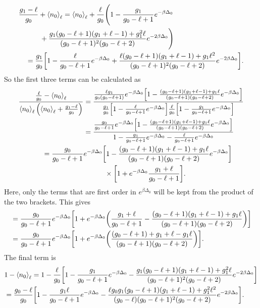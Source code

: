 \begin{align}
    &\frac{g_1-\ell}{g_0}+\left<{n_0}\right>_\ell=\left<{n_0}\right>_\ell+\frac{\ell}{g_0}\Biggr(1-\frac{g_1}{g_0-\ell+1}e^{-\beta\Delta_0}\nonumber\\
    &\quad\quad\quad+\frac{g_1(g_0-\ell+1)(g_1+\ell-1)+g_1^2 \ell}{(g_0-\ell+1)^2(g_0-\ell+2)} e^{-2\beta\Delta_0}\Biggr)\nonumber\\
    &\quad=\frac{g_1}{g_0}\qty[1-\frac{\ell}{g_0-\ell+1}e^{-\beta\Delta_0}+\frac{\ell(g_0-\ell+1)(g_1+\ell-1)+g_1\ell^2}{(g_0-\ell+1)^2(g_0-\ell+2)} e^{-2\beta\Delta_0}].
\end{align}
So the first three terms can be calculated as 
\begin{align}
    \frac{\frac{\ell}{g_0}-\left<{n_0}\right>_\ell}{\left<{n_0}\right>_\ell\qty(\left<{n_0}\right>_\ell+\frac{g_1-\ell}{g_0})}&=\frac{\frac{\ell g_1}{g_0(g_0-\ell+1)}e^{-\beta\Delta_0}\qty[1-\frac{(g_0-\ell+1)(g_1+\ell-1)+g_1\ell}{(g_0-\ell+1)(g_0-\ell+2)}e^{-\beta\Delta_0}]}{\frac{g_1}{g_0}\qty[1-\frac{\ell}{g_0-\ell+1} e^{-\beta\Delta_0}]\frac{\ell}{g_0}\qty[1-\frac{g_1}{g_0-\ell+1} e^{-\beta\Delta_0}]}\nonumber\\
    &=\frac{\frac{g_0}{g_0-\ell+1}e^{-\beta\Delta_0}\qty[1-\frac{(g_0-\ell+1)(g_1+\ell-1)+g_1\ell}{(g_0-\ell+1)(g_0-\ell+2)}e^{-\beta\Delta_0}]}{1-\frac{g_1}{g_0-\ell+1}e^{-\beta\Delta_0}-\frac{\ell}{g_0-\ell+1}e^{-\beta\Delta_0}}\nonumber\\
    =\frac{g_0}{g_0-\ell+1}&e^{-\beta\Delta_0}\qty[1-\frac{(g_0-\ell+1)(g_1+\ell-1)+g_1\ell}{(g_0-\ell+1)(g_0-\ell+2)}e^{-\beta\Delta_0}]\nonumber\\
    &\quad\quad\quad\times\qty[1+e^{-\beta\Delta_0} \frac{g_1+\ell}{g_0-\ell+1}].
\end{align}
Here, only the terms that are first order in $e^{\beta\Delta_0}$ will be kept from the product of the two brackets. This gives
\begin{align}
    &=\frac{g_0}{g_0-\ell+1}e^{-\beta\Delta_0}\qty[1+e^{-\beta\Delta_0}\qty(\frac{g_1+\ell}{g_0-\ell+1}-\frac{(g_0-\ell+1)(g_1+\ell-1)+g_1\ell}{(g_0-\ell+1)(g_0-\ell+2)})]\nonumber\\
    &=\frac{g_0}{g_0-\ell+1}e^{-\beta\Delta_0}\qty[1+e^{-\beta\Delta_0}\qty(\frac{(g_0-\ell+1)+g_1+\ell-g_1\ell}{(g_0-\ell+1)(g_0-\ell+2)})].
\end{align}
The final term is
\begin{align}
    &1-\left<{n_0}\right>_\ell=1-\frac{\ell}{g_0}\qty[1-\frac{g_1}{g_0-\ell+1}e^{-\beta\Delta_0}-\frac{g_1(g_0-\ell+1)(g_1+\ell-1)+g_1^2\ell}{(g_0-\ell+1)^2(g_0-\ell+2)}e^{-2\beta\Delta_0}]\nonumber\\
    &=\frac{g_0-\ell}{g_0}\qty[1-\frac{g_1\ell}{g_0-\ell+1}e^{-\beta\Delta_0}-\frac{\ell g_0g_1(g_0-\ell+1)(g_1+\ell-1)+g_1^2\ell^2}{(g_0-\ell)(g_0-\ell+1)^2(g_0-\ell+2)}e^{-2\beta\Delta_0}].
\end{align}
